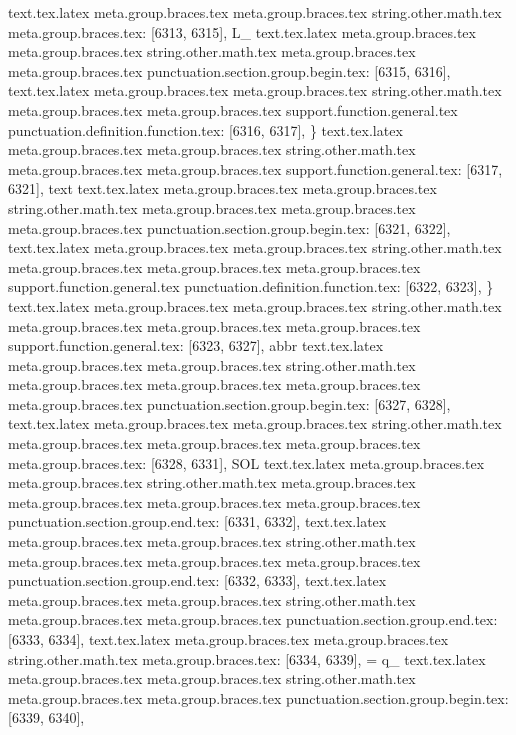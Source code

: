 {{{{{{{{{{{{{{{{{{{{{{{{{{{{{{{{{{{{{{{{{{{{{{{{{{{{{{{{{{{{{{{{{{{{{{{{{{{{{{{{{{{{{{{{{{{{{{{{{{{{{{{{{{{{{{{{{{{{{{{{{{{{{{{{{{{{{{{{{{{{{{{{{{{{{{{{{{{{{{{{{{{{{{{{{{{{text.tex.latex meta.group.braces.tex meta.group.braces.tex string.other.math.tex meta.group.braces.tex: [6313, 6315], {L_}
text.tex.latex meta.group.braces.tex meta.group.braces.tex string.other.math.tex meta.group.braces.tex meta.group.braces.tex punctuation.section.group.begin.tex: [6315, 6316], {{}
text.tex.latex meta.group.braces.tex meta.group.braces.tex string.other.math.tex meta.group.braces.tex meta.group.braces.tex support.function.general.tex punctuation.definition.function.tex: [6316, 6317], {\}
text.tex.latex meta.group.braces.tex meta.group.braces.tex string.other.math.tex meta.group.braces.tex meta.group.braces.tex support.function.general.tex: [6317, 6321], {text}
text.tex.latex meta.group.braces.tex meta.group.braces.tex string.other.math.tex meta.group.braces.tex meta.group.braces.tex meta.group.braces.tex punctuation.section.group.begin.tex: [6321, 6322], {{}
text.tex.latex meta.group.braces.tex meta.group.braces.tex string.other.math.tex meta.group.braces.tex meta.group.braces.tex meta.group.braces.tex support.function.general.tex punctuation.definition.function.tex: [6322, 6323], {\}
text.tex.latex meta.group.braces.tex meta.group.braces.tex string.other.math.tex meta.group.braces.tex meta.group.braces.tex meta.group.braces.tex support.function.general.tex: [6323, 6327], {abbr}
text.tex.latex meta.group.braces.tex meta.group.braces.tex string.other.math.tex meta.group.braces.tex meta.group.braces.tex meta.group.braces.tex meta.group.braces.tex punctuation.section.group.begin.tex: [6327, 6328], {{}
text.tex.latex meta.group.braces.tex meta.group.braces.tex string.other.math.tex meta.group.braces.tex meta.group.braces.tex meta.group.braces.tex meta.group.braces.tex: [6328, 6331], {SOL}
text.tex.latex meta.group.braces.tex meta.group.braces.tex string.other.math.tex meta.group.braces.tex meta.group.braces.tex meta.group.braces.tex meta.group.braces.tex punctuation.section.group.end.tex: [6331, 6332], {}}
text.tex.latex meta.group.braces.tex meta.group.braces.tex string.other.math.tex meta.group.braces.tex meta.group.braces.tex meta.group.braces.tex punctuation.section.group.end.tex: [6332, 6333], {}}
text.tex.latex meta.group.braces.tex meta.group.braces.tex string.other.math.tex meta.group.braces.tex meta.group.braces.tex punctuation.section.group.end.tex: [6333, 6334], {}}
text.tex.latex meta.group.braces.tex meta.group.braces.tex string.other.math.tex meta.group.braces.tex: [6334, 6339], { = q_}
text.tex.latex meta.group.braces.tex meta.group.braces.tex string.other.math.tex meta.group.braces.tex meta.group.braces.tex punctuation.section.group.begin.tex: [6339, 6340], {{}
}}}}}}}}}}}}}}}}}}}}}}}}}}}}}}}}}}}}}}}}}}}}}}}}}}}}}}}}}}}}}}}}}}}}}}}}}}}}}}}}}}}}}}}}}}}}}}}}}}}}}}}}}}}}}}}}}}}}}}}}}}}}}}}}}}}}}}}}}}}}}}}}}}}}}}}}}}}}}}}}}}}}}}}}}}}}}}}
